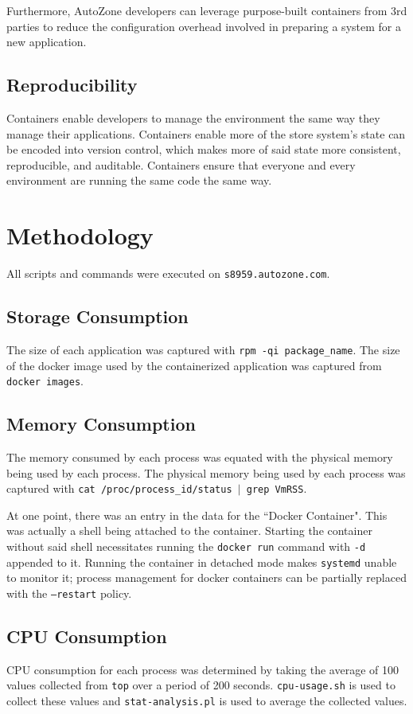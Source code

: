 \documentclass{article}
\begin{document}
Furthermore, AutoZone developers can leverage purpose-built containers from 3rd parties to reduce the configuration overhead involved in preparing a system for a new application. 

\subsection{Reproducibility}
Containers enable developers to manage the environment the same way they manage their applications. Containers enable more of the store system's state can be encoded into version control, which makes more of said state more consistent, reproducible, and auditable. Containers ensure that everyone and every environment are running the same code the same way.

\section{Methodology}
All scripts and commands were executed on \texttt{s8959.autozone.com}.

\subsection{Storage Consumption}
The size of each application was captured with \texttt{rpm -qi package\_name}. The size of the docker image used by the containerized application was captured from \texttt{docker images}.

\subsection{Memory Consumption}
The memory consumed by each process was equated with the physical memory being used by each process. The physical memory being used by each process was captured with \texttt{cat /proc/process\_id/status $|$ grep VmRSS}.

At one point, there was an entry in the data for the ``Docker Container". This was actually a shell being attached to the container. Starting the container without said shell necessitates running the \texttt{docker run} command with \texttt{-d} appended to it. Running the container in detached mode makes \texttt{systemd} unable to monitor it; process management for docker containers can be partially replaced with the \texttt{--restart} policy.

\subsection{CPU Consumption}
CPU consumption for each process was determined by taking the average of 100 values collected from \texttt{top} over a period of 200 seconds. \texttt{cpu-usage.sh} is used to collect these values and \texttt{stat-analysis.pl} is used to average the collected values.
\end{document}
